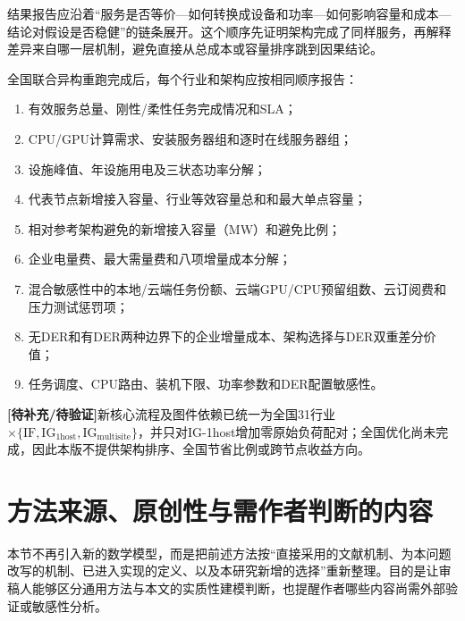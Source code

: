 \documentclass[preprint]{elsarticle}
\newcommand{\pending}{\textcolor{red!70!black}{\textbf{[待补充/待验证]}}}
\begin{document}
结果报告应沿着“服务是否等价---如何转换成设备和功率---如何影响容量和成本---结论对假设是否稳健”的链条展开。这个顺序先证明架构完成了同样服务，再解释差异来自哪一层机制，避免直接从总成本或容量排序跳到因果结论。

全国联合异构重跑完成后，每个行业和架构应按相同顺序报告：

\begin{enumerate}
  \item 有效服务总量、刚性/柔性任务完成情况和SLA；
  \item CPU/GPU计算需求、安装服务器组和逐时在线服务器组；
  \item 设施峰值、年设施用电及三状态功率分解；
  \item 代表节点新增接入容量、行业等效容量总和和最大单点容量；
  \item 相对参考架构避免的新增接入容量（MW）和避免比例；
  \item 企业电量费、最大需量费和八项增量成本分解；
  \item 混合敏感性中的本地/云端任务份额、云端GPU/CPU预留组数、云订阅费和压力测试惩罚项；
  \item 无DER和有DER两种边界下的企业增量成本、架构选择与DER双重差分价值；
  \item 任务调度、CPU路由、装机下限、功率参数和DER配置敏感性。
\end{enumerate}

\pending 新核心流程及图件依赖已统一为全国31行业$\times\{\mathrm{IF},\mathrm{IG}_{1\mathrm{host}},\mathrm{IG}_{\mathrm{multisite}}\}$，并只对IG-1host增加零原始负荷配对；全国优化尚未完成，因此本版不提供架构排序、全国节省比例或跨节点收益方向。

\section{方法来源、原创性与需作者判断的内容}

本节不再引入新的数学模型，而是把前述方法按“直接采用的文献机制、为本问题改写的机制、已进入实现的定义、以及本研究新增的选择”重新整理。目的是让审稿人能够区分通用方法与本文的实质性建模判断，也提醒作者哪些内容尚需外部验证或敏感性分析。
\end{document}
